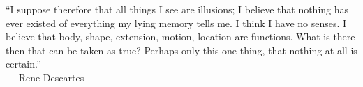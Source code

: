 
“I suppose therefore that all things I see are illusions; I believe that nothing has ever existed of everything my lying memory tells me. I think I have no senses. I believe that body, shape, extension, motion, location are functions. What is there then that can be taken as true? Perhaps only this one thing, that nothing at all is certain.” \\
\footnotesize
--- Rene Descartes

